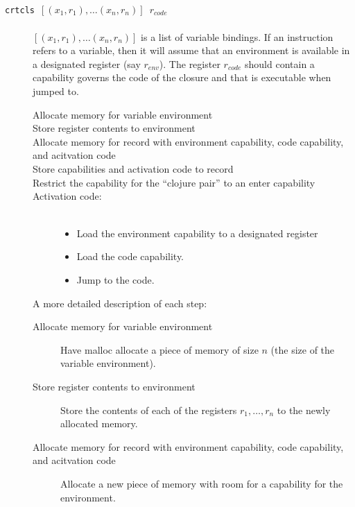 \documentclass[a4paper]{article}
\newcommand{\forcenewline}{$\phantom{v}$\\}
\newcommand{\var}[1]{\mathit{#1}}
\begin{document}
              \begin{description}
              \item[\texttt{crtcls $[(x_1,r_1),\dots(x_n,r_n)]$ $r_{\var{code}}$}] \forcenewline
                $[(x_1,r_1),\dots(x_n,r_n)]$ is a list of variable bindings. If an instruction refers to a variable, then it will assume that an environment is available in a designated register (say $r_{\var{env}}$). The register $r_{\var{code}}$ should contain a capability governs the code of the closure and that is executable when jumped to.
                \begin{description}
                \item[Allocate memory for variable environment]
                \item[Store register contents to environment]
                \item[Allocate memory for record with environment capability, code capability, and acitvation code]
                \item[Store capabilities and activation code to record]
                \item[Restrict the capability for the ``clojure pair'' to an enter capability]
                \item[Activation code:] \forcenewline
                  \begin{itemize}
                  \item Load the environment capability to a designated register
                  \item Load the code capability.
                  \item Jump to the code.
                  \end{itemize}
                \end{description}
                A more detailed description of each step:
                \begin{description}
                \item[Allocate memory for variable environment] Have malloc allocate a piece of memory of size $n$ (the size of the variable environment). 
                \item[Store register contents to environment] Store the contents of each of the registers $r_1,\dots,r_n$ to the newly allocated memory.
                \item[Allocate memory for record with environment capability, code capability, and acitvation code] Allocate a new piece of memory with room for a capability for the environment.

\end{description}
\end{description}
\end{document}
